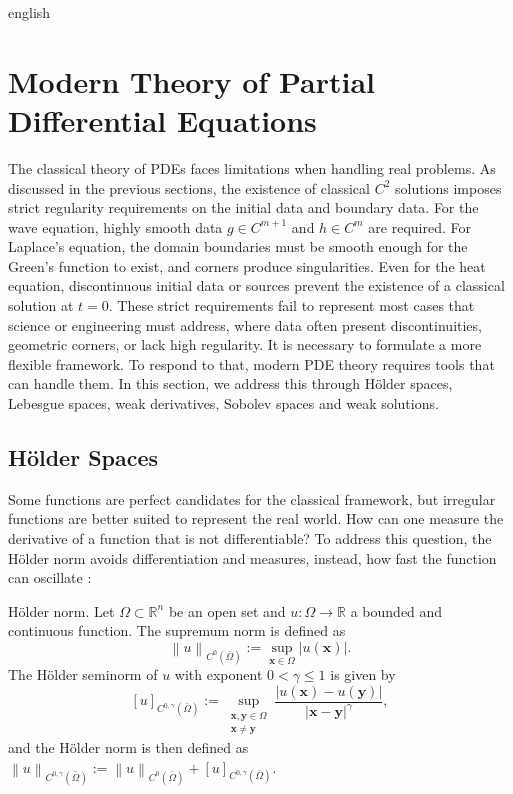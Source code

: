 \documentclass[12pt,letterpaper,twoside]{book}
\newcommand{\norm}[1]{\left\lVert #1 \right\rVert}
\newcommand{\abs}[1]{\left\lvert #1 \right\rvert}
\begin{document}
\begin{hyphenrules}{english}
\section{Modern Theory of Partial Differential Equations}\label{sec:modern-theory}

The classical theory of PDEs faces limitations when handling real problems. As discussed in the
previous sections, the existence of classical $C^2$ solutions imposes strict regularity requirements on
the initial data and boundary data. For the wave equation, highly smooth data $g\in C^{m+1}$ and
$h\in C^m$ are required. For Laplace's equation, the domain boundaries must be smooth enough for the
Green's function to exist, and corners produce singularities. Even for the heat equation, discontinuous
initial data or sources prevent the existence of a classical solution at $t=0$. These strict
requirements fail to represent most cases that science or engineering must address, where data often
present discontinuities, geometric corners, or lack high regularity. It is necessary to formulate a more
flexible framework. To respond to that, modern PDE theory requires tools that can handle them. In this
section, we address this through Hölder spaces, Lebesgue spaces, weak derivatives, Sobolev spaces and
weak solutions.

\subsection{Hölder Spaces}\label{subsec:holder}

Some functions are perfect candidates for the classical framework, but irregular functions are better
suited to represent the real world. How can one measure the derivative of a function that is not
differentiable? To address this question, the Hölder norm avoids differentiation and measures, instead,
how fast the function can oscillate \cite{evans2010}:

\begin{definicion}{Hölder norm.}\label{def:holder-norm}
Let $\Omega\subset\mathbb{R}^n$ be an open set and $u:\Omega\to\mathbb{R}$ a bounded and continuous function. The
supremum norm is defined as
\[
  \norm{u}_{C^0(\bar\Omega)}:=\sup_{\mathbf{x}\in\Omega}\abs{u(\mathbf{x})}.
\]
The Hölder seminorm of $u$ with exponent $0<\gamma\le1$ is given by
\[
  [u]_{C^{0,\gamma}(\bar\Omega)}:=\sup_{\substack{\mathbf{x},\mathbf{y}\in\Omega\\ \mathbf{x}\neq\mathbf{y}}}
  \frac{\abs{u(\mathbf{x})-u(\mathbf{y})}}{\abs{\mathbf{x}-\mathbf{y}}^{\gamma}},
\]
and the Hölder norm is then defined as
$\norm{u}_{C^{0,\gamma}(\bar\Omega)}:=\norm{u}_{C^0(\bar\Omega)}+[u]_{C^{0,\gamma}(\bar\Omega)}$.
\end{definicion}


\end{hyphenrules}
\end{document}
